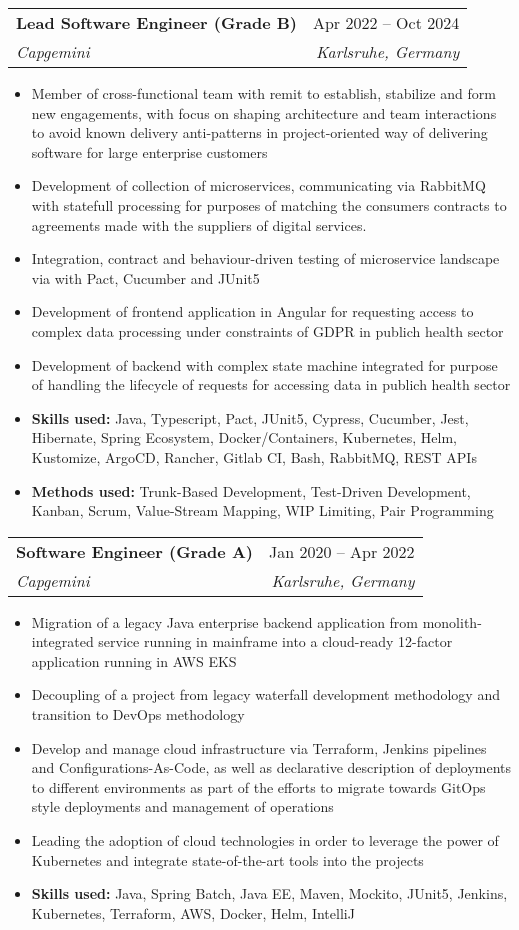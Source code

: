 \documentclass[a4paper,12pt]{article}
\makeatletter
\newcommand{\resumeItem}[1]{
	\item\small{
		{#1 \vspace{-2pt}}
	}
}
\newcommand{\resumeSubheading}[4]{
	\vspace{-2pt}\item
	\begin{tabular*}{0.97\textwidth}[t]{l@{\extracolsep{\fill}}r}
		\textbf{#1} & #2 \\
		\textit{\small#3} & \textit{\small #4} \\
	\end{tabular*}\vspace{-7pt}
}
\newcommand{\resumeItemListStart}{\begin{itemize}}
\newcommand{\resumeItemListEnd}{\end{itemize}\vspace{-5pt}}
\makeatother
\begin{document}
		\resumeSubheading
		{Lead Software Engineer (Grade B)}{Apr 2022 -- Oct 2024}
		{Capgemini}{Karlsruhe, Germany}
			\resumeItemListStart
				\resumeItem{Member of cross-functional team with remit to establish, stabilize and form new engagements, with focus
					on shaping architecture and team interactions to avoid known delivery anti-patterns in project-oriented
					way of delivering software for large enterprise customers}
				\resumeItem{Development of collection of microservices, communicating via RabbitMQ with statefull processing for purposes of matching 
				the consumers contracts to agreements made with the suppliers of digital services.}
				\resumeItem{Integration, contract and behaviour-driven testing of microservice landscape via with Pact, Cucumber and JUnit5}
				\resumeItem{Development of frontend application in Angular for requesting access to complex data processing under constraints of GDPR in publich health sector}
				\resumeItem{Development of backend with complex state machine integrated for purpose of handling the lifecycle of requests for accessing data in publich health sector}
				\resumeItem{\textbf{Skills used: }{Java, Typescript, Pact, JUnit5, Cypress, Cucumber, Jest, Hibernate, Spring Ecosystem, Docker/Containers, Kubernetes, Helm, Kustomize, ArgoCD, Rancher, Gitlab CI, Bash, RabbitMQ, REST APIs}}
				\resumeItem{\textbf{Methods used: }{Trunk-Based Development, Test-Driven Development, Kanban, Scrum, Value-Stream Mapping, WIP Limiting, Pair Programming}}
			\resumeItemListEnd
	
		\resumeSubheading{Software Engineer (Grade A)}{Jan 2020 -- Apr 2022 }{Capgemini}{Karlsruhe, Germany}
			\resumeItemListStart
				\resumeItem{Migration of a legacy Java enterprise backend application from monolith-integrated service running in
				mainframe into a cloud-ready 12-factor application running in AWS EKS}
				\resumeItem{Decoupling of a project from legacy waterfall development methodology and transition to
					DevOps methodology}
				\resumeItem{Develop and manage cloud infrastructure via Terraform, Jenkins pipelines and Configurations-As-Code, as well as
					declarative description of deployments to different environments as part of the efforts to migrate towards
					GitOps style deployments and management of operations}
				\resumeItem{Leading the adoption of cloud technologies in order to leverage the power of Kubernetes and integrate
					state-of-the-art tools into the projects}
				\resumeItem{\textbf{Skills used: }{Java, Spring Batch, Java EE, Maven, Mockito, JUnit5, Jenkins, Kubernetes, Terraform, AWS, Docker, Helm, IntelliJ}}
			\resumeItemListEnd
	
\end{document}
